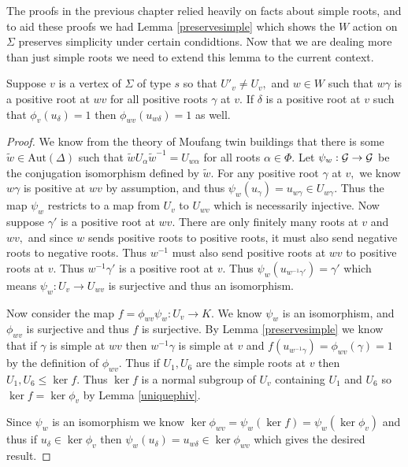 \documentclass[class=book, crop=false]{standalone}
\begin{document}
The proofs in the previous chapter relied heavily on facts about simple roots, and to aid these proofs we had Lemma \ref{preservesimple} which shows the $W$ action on $\Sigma$ preserves simplicity under certain condidtions. Now that we are dealing more than just simple roots we need to extend this lemma to the current context.

\begin{lemma}
	\label{preservemapto1}
	Suppose $v$ is a vertex of $\Sigma$ of type $s$ so that $U'_v\neq U_v,$ and $w\in W$ such that $w\gamma$ is a positive root at $wv$ for all positive roots $\gamma$ at $v.$ If $\delta$ is a positive root at $v$ such that $\phi_v(u_\delta)=1$ then $\phi_{wv}(u_{w\delta})=1$ as well.
\end{lemma}
\begin{proof}
	We know from the theory of Moufang twin buildings that there is some $\tilde{w}\in \mathrm{Aut}(\Delta)$ such that $\tilde{w}U_\alpha\tilde{w}^{-1}=U_{w\alpha}$ for all roots $\alpha\in \Phi.$ Let $\psi_w:\mathcal{G}\to \mathcal{G}$ be the conjugation isomorphism defined by $\tilde{w}.$ For any positive root $\gamma$ at $v,$ we know $w\gamma$ is positive at $wv$ by assumption, and thus $\psi_w(u_\gamma)=u_{w\gamma}\in U_{w\gamma}.$ Thus the map $\psi_w$ restricts to a map from $U_v$ to $U_{wv}$ which is necessarily injective. Now suppose $\gamma'$ is a positive root at $wv.$ There are only finitely many roots at $v$ and $wv,$ and since $w$ sends positive roots to positive roots, it must also send negative roots to negative roots. Thus $w^{-1}$ must also send positive roots at $wv$ to positive roots at $v.$ Thus $w^{-1}\gamma'$ is a positive root at $v.$ Thus $\psi_w(u_{w^{-1}\gamma'})=\gamma'$ which means $\psi_w:U_v\to U_{wv}$ is surjective and thus an isomorphism.

	Now consider the map $f=\phi_{wv}\psi_w:U_v\to K.$ We know $\psi_w$ is an isomorphism, and $\phi_{wv}$ is surjective and thus $f$ is surjective. By Lemma \ref{preservesimple} we know that if $\gamma$ is simple at $wv$ then $w^{-1}\gamma$ is simple at $v$ and $f(u_{w^{-1}\gamma})=\phi_{wv}(\gamma)=1$ by the definition of $\phi_{wv}.$ Thus if $U_1,U_6$ are the simple roots at $v$ then $U_1,U_6\le \ker f.$ Thus $\ker f$ is a normal subgroup of $U_v$ containing $U_1$ and $U_6$ so $\ker f=\ker \phi_v$ by Lemma \ref{uniquephiv}.

	Since $\psi_w$ is an isomorphism we know $\ker \phi_{wv}=\psi_w(\ker f)=\psi_w(\ker \phi_{v})$ and thus if $u_\delta\in \ker \phi_v$ then $\psi_w(u_\delta)=u_{w\delta}\in \ker \phi_{wv}$ which gives the desired result.
\end{proof}
\end{document}
